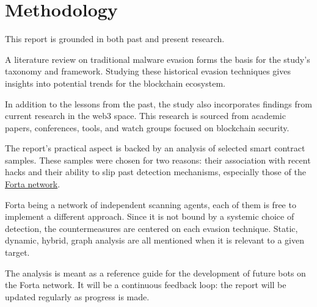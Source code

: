 \section{Methodology} \label{sec:methodology}

This report is grounded in both past and present research.

A literature review on traditional malware evasion forms the basis for the study's taxonomy and framework.
Studying these historical evasion techniques gives insights into potential trends for the blockchain ecosystem.

In addition to the lessons from the past, the study also incorporates findings from current research in the web3 space.
This research is sourced from academic papers, conferences, tools, and watch groups focused on blockchain security.

The report's practical aspect is backed by an analysis of selected smart contract samples.
These samples were chosen for two reasons: their association with recent hacks and their ability to slip past detection mechanisms, especially those of the \href{https://explorer.forta.network/}{Forta network}.

Forta being a network of independent scanning agents, each of them is free to implement a different approach.
Since it is not bound by a systemic choice of detection, the countermeasures are centered on each evasion technique.
Static, dynamic, hybrid, graph analysis are all mentioned when it is relevant to a given target.

The analysis is meant as a reference guide for the development of future bots on the Forta network.
It will be a continuous feedback loop: the report will be updated regularly as progress is made.
